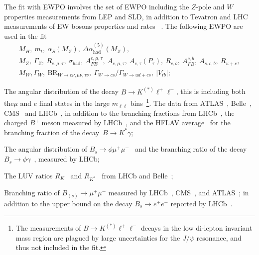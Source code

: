 \begin{itemize}
	\setlength\itemsep{0em}
	{\item The fit with EWPO involves the set of EWPO including the $Z$-pole and $W$ properties measurements from LEP and SLD, in addition to  Tevatron and LHC measurements of  EW bosons properties and rates ~\cite{ALEPH:2005ab,Abe:2000uc,Group:2012gb,Schael:2013ita,Aaboud:2017svj,Khachatryan:2014iya,Abazov:2011ws}. The following EWPO are used in the fit 
		\begin{gather*}
			M_H,~m_t,~\alpha_S(M_Z),~\Delta \alpha_{\mathrm{had}}^{(5)}(M_Z),\\
			M_{Z},~\Gamma_{Z},~R_{e,\mu,\tau},~\sigma_{\mathrm{had}}, ~A^{e,\mu,\tau}_{FB},~A_{e,\mu,\tau},~A_{e,\tau}(P_\tau),~ R_{c,b},~A^{c,b}_{FB},~A_{s,c,b},~R_{u+c}, \\
			M_{W},\Gamma_{W},~\mathrm{BR}_{W\to e \nu,\mu \nu,\tau \nu},~\Gamma_{W\to cs}/\Gamma_{W\to ud+cs},~\left|V_{tb}\right|;
		\end{gather*}
	}
	\item The angular distribution of the decay $B\to K^{(*)}\ell^+\ell^-$, this is including both the$\mu$ and $e$ final states in the large $m_{\ell \ell}$ bins~\footnote{The measurements of  $B\to K^{(*)}\ell^+\ell^-$ decays in the low di-lepton invariant mass region are plagued by large uncertainties for the $J/\psi$ resonance, and thus not included in the fit.}.   The data from ATLAS~\cite{Aaboud:2018krd}, Belle~\cite{Wehle:2016yoi}, CMS~\cite{Khachatryan:2015isa,Sirunyan:2017dhj} and LHCb~\cite{Aaij:2015dea,Aaij:2020nrf}, in addition to the branching fractions from LHCb~\cite{Aaij:2016flj}, the charged $B^+$ meson measured by LHCb~\cite{Aaij:2014pli}, and the HFLAV average~\cite{Amhis:2019ckw} for the branching fraction of the decay~$B\to K^*\gamma$; 
	\item The angular distribution of $B_s\to \phi\mu^+\mu^-$~\cite{Aaij:2015esa} and the branching ratio of  the decay $B_s\to\phi\gamma$~\cite{Aaij:2012ita}, measured by LHCb;
	\item The LUV ratios $R_K$~\cite{Aaij:2019wad} and $R_{K^*}$~\cite{Aaij:2017vbb} from LHCb and Belle~\cite{Abdesselam:2019wac};
	\item Branching ratio of $B_{(s)}\to \mu^+\mu^-$ measured by LHCb~\cite{Aaij:2017vad}, CMS~\cite{Chatrchyan:2013bka}, and ATLAS~\cite{Aaboud:2018mst}; in addition to the upper bound on the decay $B_s\to e^+e^-$ reported by LHCb~\cite{Aaij:2020nol}. 
\end{itemize}
